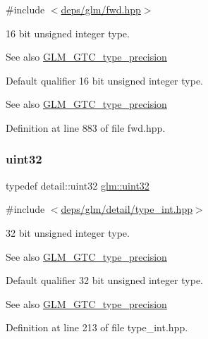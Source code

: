 {\ttfamily \#include $<$\hyperlink{fwd_8hpp}{deps/glm/fwd.\+hpp}$>$}

16 bit unsigned integer type. \begin{DoxySeeAlso}{See also}
\hyperlink{group__gtc__type__precision}{G\+L\+M\+\_\+\+G\+T\+C\+\_\+type\+\_\+precision}
\end{DoxySeeAlso}
Default qualifier 16 bit unsigned integer type. \begin{DoxySeeAlso}{See also}
\hyperlink{group__gtc__type__precision}{G\+L\+M\+\_\+\+G\+T\+C\+\_\+type\+\_\+precision} 
\end{DoxySeeAlso}


Definition at line 883 of file fwd.\+hpp.

\mbox{\label{group__gtc__type__precision_ga202b6a53c105fcb7e531f9b443518451}} 
\subsubsection{\texorpdfstring{uint32}{uint32}}
{\footnotesize\ttfamily typedef detail\+::uint32 \hyperlink{group__gtc__type__precision_ga202b6a53c105fcb7e531f9b443518451}{glm\+::uint32}}



{\ttfamily \#include $<$\hyperlink{type__int_8hpp}{deps/glm/detail/type\+\_\+int.\+hpp}$>$}

32 bit unsigned integer type. \begin{DoxySeeAlso}{See also}
\hyperlink{group__gtc__type__precision}{G\+L\+M\+\_\+\+G\+T\+C\+\_\+type\+\_\+precision}
\end{DoxySeeAlso}
Default qualifier 32 bit unsigned integer type. \begin{DoxySeeAlso}{See also}
\hyperlink{group__gtc__type__precision}{G\+L\+M\+\_\+\+G\+T\+C\+\_\+type\+\_\+precision} 
\end{DoxySeeAlso}


Definition at line 213 of file type\+\_\+int.\+hpp.

\mbox{\label{group__gtc__type__precision_ga822ca53a9ad412504532838906276a99}} 
